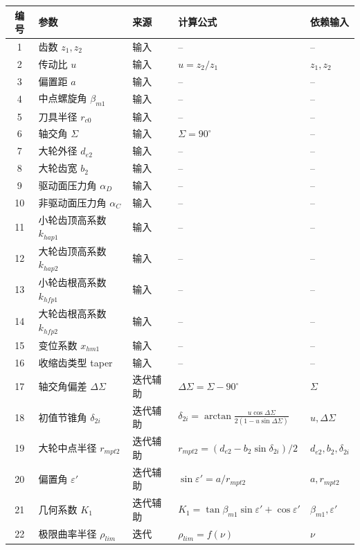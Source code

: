 ﻿\documentclass{article}
\begin{document}
\begin{table}[htbp]
\centering
\scriptsize
\begin{tabular}{@{}cp{2.3cm}p{1.2cm}p{6cm}p{4cm}@{}}
\toprule
\textbf{编号} & \textbf{参数} & \textbf{来源} & \textbf{计算公式} & \textbf{依赖输入} \\
\midrule
1 & 齿数 $z_1, z_2$ & 输入 & -- & -- \\
2 & 传动比 $u$ & 输入 & $u = z_2/z_1$ & $z_1, z_2$ \\
3 & 偏置距 $a$ & 输入 & -- & -- \\
4 & 中点螺旋角 $\beta_{m1}$ & 输入 & -- & -- \\
5 & 刀具半径 $r_{c0}$ & 输入 & -- & -- \\
6 & 轴交角 $\Sigma$ & 输入 & $\Sigma = 90^\circ$ & -- \\
7 & 大轮外径 $d_{e2}$ & 输入 & -- & -- \\
8 & 大轮齿宽 $b_2$ & 输入 & -- & -- \\
\midrule
9 & 驱动面压力角 $\alpha_{D}$ & 输入 & -- & -- \\
10 & 非驱动面压力角 $\alpha_{C}$ & 输入 & -- & -- \\
11 & 小轮齿顶高系数 $k_{hap1}$ & 输入 & -- & -- \\
12 & 大轮齿顶高系数 $k_{hap2}$ & 输入 & -- & -- \\
13 & 小轮齿根高系数 $k_{hfp1}$ & 输入 & -- & -- \\
14 & 大轮齿根高系数 $k_{hfp2}$ & 输入 & -- & -- \\
15 & 变位系数 $x_{hm1}$ & 输入 & -- & -- \\
16 & 收缩齿类型 taper & 输入 & -- & -- \\
\midrule
17 & 轴交角偏差 $\Delta\Sigma$ & 迭代辅助 & $\Delta\Sigma = \Sigma - 90^\circ$ & $\Sigma$ \\
18 & 初值节锥角 $\delta_{2i}$ & 迭代辅助 & $\delta_{2i} = \arctan\frac{u\cos\Delta\Sigma}{2(1-u\sin\Delta\Sigma)}$ & $u, \Delta\Sigma$ \\
19 & 大轮中点半径 $r_{mpt2}$ & 迭代辅助 & $r_{mpt2} = (d_{e2} - b_2\sin\delta_{2i})/2$ & $d_{e2}, b_2, \delta_{2i}$ \\
20 & 偏置角 $\varepsilon'$ & 迭代辅助 & $\sin\varepsilon' = a / r_{mpt2}$ & $a, r_{mpt2}$ \\
21 & 几何系数 $K_1$ & 迭代辅助 & $K_1 = \tan\beta_{m1}\sin\varepsilon' + \cos\varepsilon'$ & $\beta_{m1}, \varepsilon'$ \\
\midrule
22 & 极限曲率半径 $\rho_{lim}$ & 迭代 & $\rho_{lim} = f(\nu)$ & $\nu$ \\

\end{tabular}
\end{table}
\end{document}
